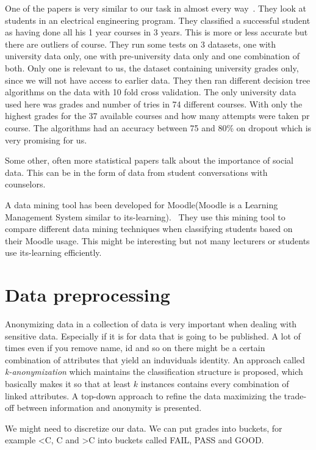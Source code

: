 \bigskip\noindent
One of the papers is very similar to our task in almost every way~\cite{7}.
They look at students in an electrical engineering program. 
They classified a successful student as having done all his 1 year courses in 3 years. 
This is more or less accurate but there are outliers of course. 
They run some tests on 3 datasets, one with university data only, one with pre-university data only and one combination of both. 
Only one is relevant to us, the dataset containing university grades only, since we will not have access to earlier data. 
They then ran different decision tree algorithms on the data with 10 fold cross validation. 
The only university data used here was grades and number of tries in 74 different courses. 
With only the highest grades for the 37 available courses and how many attempts were taken pr course.
The algorithms had an accuracy between 75 and 80\% on dropout which is very promising for us.

\bigskip\noindent
Some other, often more statistical papers talk about the importance of social data. 
This can be in the form of data from student conversations with counselors.~\cite{11} 

\bigskip\noindent
A data mining tool has been developed for Moodle(Moodle is a Learning Management System similar to its-learning).~\cite{12} 
They use this mining tool to compare different data mining techniques when classifying students based on their Moodle usage. 
This might be interesting but not many lecturers or students use its-learning efficiently. 

\section{Data preprocessing}
Anonymizing data in a collection of data is very important when dealing with sensitive data. 
Especially if it is for data that is going to be published. 
A lot of times even if you remove name, id and so on there might be a certain combination of attributes that yield an induviduals identity.
An approach called \textit{k-anonymization} which maintains the classification structure is proposed, 
which basically makes it so that at least $k$ instances contains every combination of linked attributes. 
A top-down approach to refine the data maximizing the trade-off between information and anonymity is presented.~\cite{14}

\bigskip\noindent
We might need to discretize our data.
We can put grades into buckets, for example \textless C, C and \textgreater C into buckets called FAIL, PASS and GOOD.~\cite{12}

